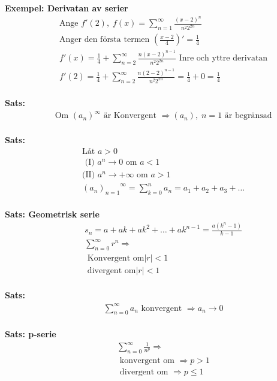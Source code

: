 \textbf{Exempel: Derivatan av serier}
\begin{align*}
  &\quad  \text{Ange } f'(2), \; f(x)= \displaystyle\sum_{n=1}^{\infty} \frac{{(x-2)}^n}{n^2 2^{2n}} \\
  &\quad  \text{Anger den första termen } (\frac{x-2}{4})' = \frac{1}{4} \\
  &\quad  f'(x) = \frac{1}{4} + \displaystyle\sum_{n=2}^{\infty} \frac{n{(x-2)}^{n-1}}{n^2 2^{2n}}
  \text{ Inre och yttre derivatan} \\
  &\quad  f'(2) =  \frac{1}{4} + \displaystyle\sum_{n=2}^{\infty} \frac{n{(2-2)}^{n-1}}{n^2 2^{2n}}
  = \frac{1}{4} + 0 = \frac{1}{4} \\
\end{align*}


\textbf{Sats: }
\begin{align*}
  &\quad  \text{Om ${(a_n)}^{\infty}$ är Konvergent } \Rightarrow (a_n), \; n=1  \text{ är begränsad}\\
\end{align*}

\textbf{Sats: }
\begin{align*}
  &\quad  \text{Låt } a>0  \\
  &\quad  \text{ (I) } a^n\to{0} \text{ om } a<1 \\
  &\quad  \text{(II) } a^n\to{+\infty} \text{ om } a>1 \\
  &\quad  {{(a_n)}_{n=1}}^{\infty}=\displaystyle\sum_{k=0}^{n}a_n=a_1+a_2+a_3+\ldots \\
\end{align*}

\textbf{Sats: Geometrisk serie}
\begin{align*}
  &\quad  s _ { n } = a + a k + a k ^ { 2 } + \ldots + a k ^ { n - 1 } = \frac { a \left( k ^ { n } - 1 \right) }
  { k - 1 } \\
  &\quad  \displaystyle\sum_{n=0}^{\infty}r^n \Rightarrow \\
  &\quad  \text{ Konvergent om} |r|<1  \\
  &\quad  \text{ divergent om} |r|<1  \\
\end{align*}

\textbf{Sats: }
\begin{align*}
  &\quad  \displaystyle\sum_{n=0}^{\infty}a_n \text{ konvergent } \Rightarrow a_n\to{0} \\
\end{align*}

\textbf{Sats: p-serie}
\begin{align*}
  &\quad  \displaystyle\sum_{n=0}^{\infty}\frac{1}{n^p} \Rightarrow \\
  &\quad  \text{ konvergent om } \Rightarrow p>1 \\
  &\quad  \text{ divergent om } \Rightarrow p\leq1 \\  
\end{align*}

